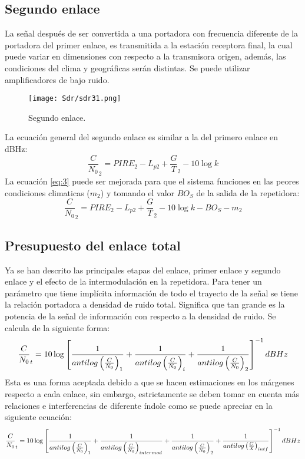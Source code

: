 \documentclass[
	12pt, %
	fleqn, %
	a4paper, %
	oneside, %
]{LegrandOrangeBook}
\begin{document}
\subsection{Segundo enlace}
La señal después de ser convertida a una portadora con frecuencia diferente de la portadora del primer enlace, es transmitida a la estación receptora final, la cual puede variar en dimensiones con respecto a la transmisora origen, además, las condiciones del clima y geográficas serán distintas. Se puede utilizar amplificadores de bajo ruido.
\begin{figure}[H]
\centering
\texttt{[image: Sdr/sdr31.png]}
\caption{Segundo enlace.}
\end{figure}
La ecuación general del segundo enlace es similar a la del primero enlace en dBHz:
\begin{equation}
\frac{C}{N_0}_2=PIRE_2-L_{p2}+\frac{G}{T}_2-10\log k
\label{eq:3}
\end{equation}
La ecuación \ref{eq:3} puede ser mejorada para que el sistema funciones en las peores condiciones climaticas ($m_2$) y tomando el valor $BO_S$ de la salida de la repetidora:
\begin{equation}
\frac{C}{N_0}_2=PIRE_2-L_{p2}+\frac{G}{T}_2-10\log k-BO_S-m_2
\end{equation}
\subsection{Presupuesto del enlace total}
Ya se han descrito las principales etapas del enlace, primer enlace y segundo enlace y el efecto de la intermodulación en la repetidora. Para tener un parámetro que tiene implícita información de todo el trayecto de la señal se tiene la relación portadora a densidad de ruido total. Significa que tan grande es la potencia de la señal de información con respecto a la densidad de ruido. Se calcula de la siguiente forma:
\begin{equation}
\frac{C}{N_0}_t=10\log\left[\frac{1}{antilog\left(\frac{C}{N_0}\right)_1}+\frac{1}{antilog\left(\frac{C}{N_0}\right)_i}+\frac{1}{antilog\left(\frac{C}{N_0}\right)_2}\right]^{-1} dBHz
\label{eq:portadora ruido total}
\end{equation}
Esta es una forma aceptada debido a que se hacen estimaciones en los márgenes respecto a cada enlace, sin embargo, estrictamente se deben tomar en cuenta más relaciones e interferencias de diferente índole como se puede apreciar en la siguiente ecuación:
\begin{equation}
\frac{C}{N_0}_t=10\log\left[\frac{1}{antilog\left(\frac{C}{N_0}\right)_1}+\frac{1}{antilog\left(\frac{C}{N_0}\right)_{intermod}}+\frac{1}{antilog\left(\frac{C}{N_0}\right)_2}+\frac{1}{antilog\left(\frac{C}{X}\right)_{intf}}\right]^{-1} dBHz
\end{equation}
\end{document}
